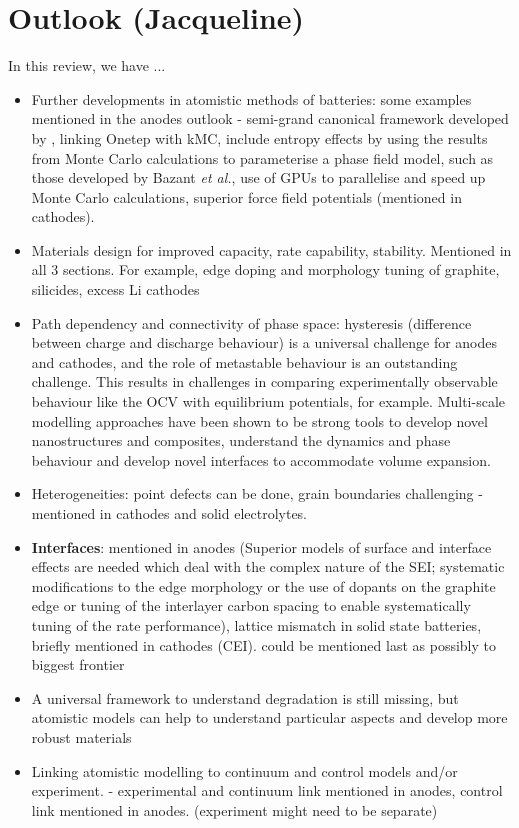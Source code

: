 \documentclass[../main.tex]{subfiles}
\begin{document}
\section{Outlook (Jacqueline)}
In this review, we have ...


\begin{itemize}

    \item Further developments in atomistic methods of batteries: some examples mentioned in the anodes outlook - semi-grand canonical framework developed by \citeauthor{VanderVen2020}, linking Onetep with kMC,  include entropy effects by using the results from Monte Carlo calculations to parameterise a phase field model, such as those developed by Bazant \textit{et al.}, use of GPUs to parallelise and speed up Monte Carlo calculations, superior force field potentials (mentioned in cathodes).
    \item Materials design for improved capacity, rate capability, stability. Mentioned in all 3 sections. For example, edge doping and morphology tuning of graphite, silicides, excess Li cathodes
    \item Path dependency and connectivity of phase space: hysteresis (difference between charge and discharge behaviour) is a universal challenge for anodes and cathodes, and the role of metastable behaviour is an outstanding challenge. This results in challenges in comparing experimentally observable behaviour like the OCV with equilibrium potentials, for example. Multi-scale modelling approaches have been shown to be strong tools to develop novel nanostructures and composites, understand the dynamics and phase behaviour and develop novel interfaces to accommodate volume expansion.
    \item Heterogeneities: point defects can be done, grain boundaries challenging - mentioned in cathodes and solid electrolytes.
    \item \textbf{Interfaces}: mentioned in anodes (Superior models of surface and interface effects are needed which deal with the complex nature of the SEI; systematic modifications to the edge morphology or the use of dopants on the graphite edge \cite{peng2020lithium,weydanz1994behavior,way1994effect} or tuning of the interlayer carbon spacing \cite{JI201866} to enable systematically tuning of the rate performance), lattice mismatch in solid state batteries, briefly mentioned in cathodes (CEI). could be mentioned last as possibly to biggest frontier
    \item A universal framework to understand degradation is still missing, but atomistic models can help to understand particular aspects and develop more robust materials
    \item Linking atomistic modelling to continuum and control models and/or experiment. - experimental and continuum link mentioned in anodes, control link mentioned in anodes. (experiment might need to be separate)

\end{itemize}
\end{document}
